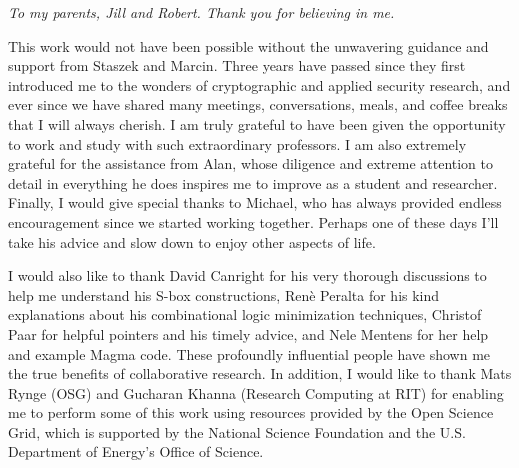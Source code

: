 \documentclass[11pt,american]{report}
\begin{document}
\beforepreface%

\vfill
\begin{center}
\indent \emph{To my parents, Jill and Robert. Thank you for believing in me.} 
\end{center}
\vfill

%
\vfill
\vspace{-2em}
\indent This work would not have been possible without the unwavering guidance and support from Staszek and Marcin. Three years have passed since they first introduced me to the wonders of cryptographic and applied security research, and ever since we have shared many meetings, conversations, meals, and coffee breaks that I will always cherish. I am truly grateful to have been given the opportunity to work and study with such extraordinary professors. I am also extremely grateful for the assistance from Alan, whose diligence and extreme attention to detail in everything he does inspires me to improve as a student and researcher. Finally, I would give special thanks to Michael, who has always provided endless encouragement since we started working together. Perhaps one of these days I'll take his advice and slow down to enjoy other aspects of life. 

I would also like to thank David Canright for his very thorough discussions to help me understand his S-box constructions, Ren\`{e} Peralta for his kind explanations about his combinational logic minimization techniques, Christof Paar for helpful pointers and his timely advice, and Nele Mentens for her help and example Magma code. These profoundly influential people have shown me the true benefits of collaborative research. In addition, I would like to thank Mats Rynge (OSG) and Gucharan Khanna (Research Computing at RIT) for enabling me to perform some of this work using resources provided by the Open Science Grid, which is supported by the National Science Foundation and the U.S. Department of Energy's Office of Science. 
\end{document}
